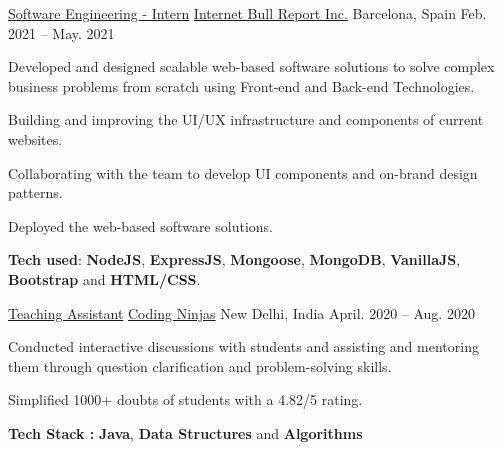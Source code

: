 \begin{cventries}
  \cventry
    {\href{https://nikhil-bhasin.netlify.app/data/LetterOfExperience_InternetBullReport.pdf}{Software Engineering - Intern}} %
    {\href{https://internetbullreport.com/}{Internet Bull Report Inc.}} %
    {Barcelona, Spain} %
    {Feb. 2021 – May. 2021} %
    {
      \begin{cvitems} %
        \item {Developed and designed scalable web-based software solutions to solve complex business problems from scratch using Front-end and Back-end Technologies.}
        \item {Building and improving the UI/UX infrastructure and components of current websites.}
        \item {Collaborating with the team to develop UI components and on-brand design patterns.}
        \item {Deployed the web-based software solutions.}
        \item {\textbf{Tech used}: \textbf{NodeJS}, \textbf{ExpressJS}, \textbf{Mongoose}, \textbf{MongoDB}, \textbf{VanillaJS}, \textbf{Bootstrap} and \textbf{HTML/CSS}.}
      \end{cvitems}
    }

  \cventry
    {\href{https://nikhil-bhasin.netlify.app/data/LetterOfExperience_CodingNinjas.pdf}{Teaching Assistant}} %
    {\href{https://nikhil-bhasin.netlify.app/data/LetterOfExperience_CodingNinjas.pdf}{Coding Ninjas}} %
    {New Delhi, India} %
    {April. 2020 – Aug. 2020} %
    {
      \begin{cvitems} %
        \item {Conducted interactive discussions with students and assisting and mentoring them through question clarification and problem-solving skills.}
        \item {Simplified 1000+ doubts of students with a 4.82/5 rating.}
        \item {\textbf{Tech Stack :} \textbf{Java}, \textbf{Data Structures} and \textbf{Algorithms}}
      \end{cvitems}
    }


\end{cventries}
